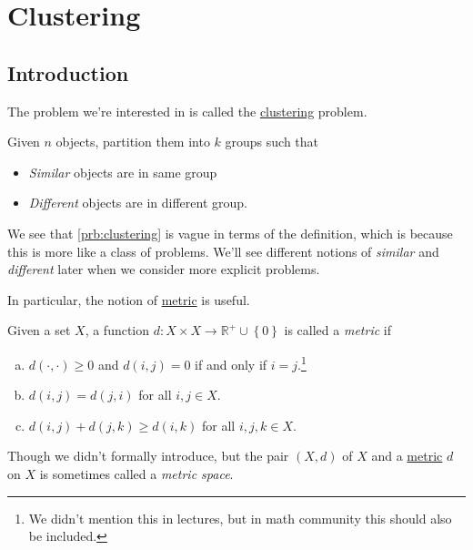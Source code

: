 
\chapter{Clustering}

\section{Introduction}

The problem we're interested in is called the \hyperref[prb:clustering]{clustering} problem.

\begin{problem}[Clustering]\label{prb:clustering}
Given \(n\) objects, partition them into \(k\) groups such that
\begin{itemize}
	\item \emph{Similar} objects are in same group
	\item \emph{Different} objects are in different group.
\end{itemize}
\end{problem}

\begin{note}
	We see that \autoref{prb:clustering} is vague in terms of the definition, which is because this is more like a class of problems. We'll see different notions of \emph{similar} and \emph{different} later when we consider more explicit problems.
\end{note}

In particular, the notion of \hyperref[def:metric]{metric} is useful.

\begin{definition}[Metric]\label{def:metric}
	Given a set \(X\), a function \(d\colon X\times X\to \mathbb{R} ^+ \cup \left\{ 0 \right\} \) is called a \emph{metric} if
	\begin{enumerate}[(a)]
		\item \(d(\cdot, \cdot) \geq 0\) and \(d(i, j) = 0\) if and only if \(i = j\).\footnote{We didn't mention this in lectures, but in math community this should also be included.}
		\item \(d(i, j) = d(j, i)\) for all \(i, j\in X\).
		\item \(d(i, j) + d(j, k) \geq d(i, k)\) for all \(i, j, k\in X\).
	\end{enumerate}
\end{definition}

\begin{remark}\label{rmk:metric-space}
	Though we didn't formally introduce, but the pair \((X, d)\) of \(X\) and a \hyperref[def:metric]{metric} \(d\) on \(X\) is sometimes called a \emph{metric space}.
\end{remark}

